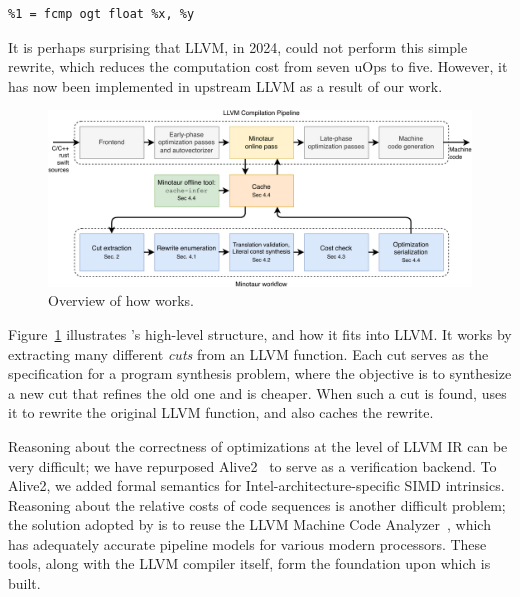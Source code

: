 {\begin{quoting}\begin{Verbatim}
%1 = fcmp ogt float %x, %y
\end{Verbatim}
\end{quoting}}

It is perhaps surprising that LLVM, in 2024, could not perform this
simple rewrite, which reduces the computation cost from seven uOps to
five.
%
However, it has now been implemented in upstream LLVM as a result of
our work.

\begin{figure}[tbp]
    \includegraphics[width=\linewidth]{figures/flowchart.pdf}
    \caption{Overview of how \minotaur{} works.}
    \label{fig:workflow}
\end{figure}

Figure~\ref{fig:workflow} illustrates \minotaur's high-level structure,
and how it fits into LLVM\@.
%
It works by extracting many different \textit{cuts} from an LLVM function.
%
Each cut serves as the specification for a program synthesis
problem, where the objective is to synthesize a new cut that refines
the old one and is cheaper.
%
When such a cut is found, \minotaur{} uses it to rewrite the original
LLVM function, and also caches the rewrite.


Reasoning about the correctness of optimizations at the level of LLVM
IR can be very difficult; we have repurposed Alive2~\cite{alive2} to
serve as a verification backend.
%
To Alive2, we added formal semantics for Intel-architecture-specific
SIMD intrinsics.
%
Reasoning about the relative costs of code sequences is another
difficult problem; the solution adopted by \minotaur{} is to reuse the
LLVM Machine Code Analyzer~\cite{llvmmca}, which has adequately
accurate pipeline models for various modern processors.
%
These tools, along with the LLVM compiler itself, form the
foundation upon which \minotaur{} is built.


